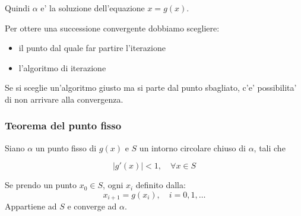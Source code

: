 Quindi $\alpha$ e' la soluzione dell'equazione $x = g(x)$.

Per ottere una successione convergente dobbiamo scegliere:
\begin{itemize}
  \item il punto dal quale far partire l'iterazione
  \item l'algoritmo di iterazione
\end{itemize}

Se si sceglie un'algoritmo giusto ma si parte dal punto sbagliato, c'e' possibilita' di non arrivare
alla convergenza.

\subsubsection{Teorema del punto fisso}

Siano $\alpha$ un punto fisso di $g(x)$ e $S$ un intorno circolare chiuso di $\alpha$, tali che

\begin{equation*}
  |g'(x)| < 1, \quad \forall x \in S
\end{equation*}

Se prendo un punto $x_0 \in S$, ogni $x_i$ definito dalla:
\begin{equation*}
  x_{i+1} = g(x_i), \quad i = 0, 1, \dots
\end{equation*}
Appartiene ad $S$ e converge ad $\alpha$.
